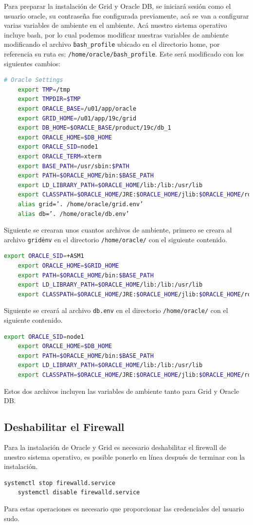 \documentclass{article}
\begin{document}
Para preparar la instalación de Grid y Oracle DB, se iniciará sesión como el usuario oracle, su contraseña fue configurada previamente, acá se van a configurar varias variables de ambiente en el ambiente. Acá nuestro sistema operativo incluye bash, por lo cual podemos modificar nuestras variables de ambiente modificando el archivo \texttt{\.bash\_profile} ubicado en el directorio home, por referencia su ruta es: \texttt{/home/oracle/\.bash\_profile}. Este será modificado con los siguientes cambios:

\begin{lstlisting}[style=mystyle,language=bash]
	# Oracle Settings
	export TMP=/tmp
	export TMPDIR=$TMP
	export ORACLE_BASE=/u01/app/oracle
	export GRID_HOME=/u01/app/19c/grid
	export DB_HOME=$ORACLE_BASE/product/19c/db_1
	export ORACLE_HOME=$DB_HOME
	export ORACLE_SID=node1
	export ORACLE_TERM=xterm
	export BASE_PATH=/usr/sbin:$PATH
	export PATH=$ORACLE_HOME/bin:$BASE_PATH
	export LD_LIBRARY_PATH=$ORACLE_HOME/lib:/lib:/usr/lib
	export CLASSPATH=$ORACLE_HOME/JRE:$ORACLE_HOME/jlib:$ORACLE_HOME/rdbms/jlib
	alias grid=’. /home/oracle/grid.env’
	alias db=’. /home/oracle/db.env’
\end{lstlisting}

Siguiente se crearan unos cuantos archivos de ambiente, primero se creara al archivo \texttt{grid\.env} en el directorio \texttt{/home/oracle/} con el siguiente contenido.

\begin{lstlisting}[style=mystyle,language=bash]
	export ORACLE_SID=+ASM1
	export ORACLE_HOME=$GRID_HOME
	export PATH=$ORACLE_HOME/bin:$BASE_PATH
	export LD_LIBRARY_PATH=$ORACLE_HOME/lib:/lib:/usr/lib
	export CLASSPATH=$ORACLE_HOME/JRE:$ORACLE_HOME/jlib:$ORACLE_HOME/rdbms/jlib
\end{lstlisting}

Siguiente se creará al archivo \texttt{db.env} en el directorio \texttt{/home/oracle/} con el siguiente contenido.

\begin{lstlisting}[style=mystyle,language=bash]
	export ORACLE_SID=node1
	export ORACLE_HOME=$DB_HOME
	export PATH=$ORACLE_HOME/bin:$BASE_PATH
	export LD_LIBRARY_PATH=$ORACLE_HOME/lib:/lib:/usr/lib
	export CLASSPATH=$ORACLE_HOME/JRE:$ORACLE_HOME/jlib:$ORACLE_HOME/rdbms/jlib
\end{lstlisting}

Estos dos archivos incluyen las variables de ambiente tanto para Grid y Oracle DB.

\subsection{Deshabilitar el Firewall}

Para la instalación de Oracle y Grid es necesario deshabilitar el firewall de nuestro sistema operativo, es posible ponerlo en línea después de terminar con la instalación.

\begin{lstlisting}[style=mystyle,language=bash]
	systemctl stop firewalld.service
	systemctl disable firewalld.service
\end{lstlisting}

Para estas operaciones es necesario que proporcionar las credenciales del usuario sudo.
\end{document}
